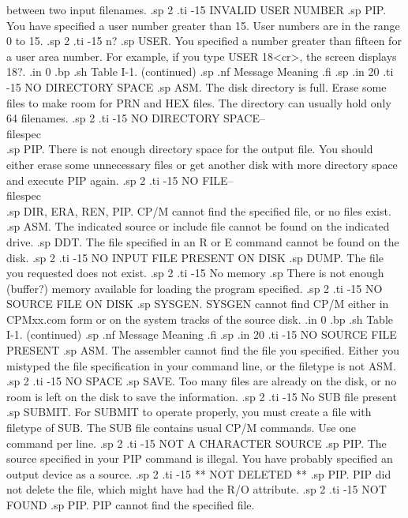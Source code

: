 between two input filenames.
.sp 2
.ti -15
INVALID USER NUMBER
.sp
PIP.  You have specified a user number greater than 15.  User 
numbers are in the range 0 to 15.
.sp 2
.ti -15
n?
.sp
USER.  You specified a number greater than fifteen for a user 
area number.  For example, if you type USER 18<cr>, the screen 
displays 18?.
.in 0
.bp
.sh
                     Table I-1.  (continued)
.sp
.nf
     Message        Meaning
.fi
.sp
.in 20
.ti -15
NO DIRECTORY SPACE
.sp
ASM.  The disk directory is full.  Erase some files to make room 
for PRN and HEX files.  The directory can usually hold only 64 
filenames.
.sp 2
.ti -15
NO DIRECTORY SPACE--\\{filespec\\}
.sp
PIP.  There is not enough directory space for the output file.  
You should either erase some unnecessary files or get another 
disk with more directory space and execute PIP again.
.sp 2
.ti -15
NO FILE--\\{filespec\\}
.sp
DIR, ERA, REN, PIP.  CP/M cannot find the specified file, or no 
files exist.
.sp
ASM.  The indicated source or include file cannot be found on the 
indicated drive.
.sp
DDT.  The file specified in an R or E command cannot be found on 
the disk.
.sp 2
.ti -15
NO INPUT FILE PRESENT ON DISK
.sp
DUMP.  The file you requested does not exist.
.sp 2
.ti -15
No memory
.sp
There is not enough (buffer?) memory available for loading the 
program specified.
.sp 2
.ti -15
NO SOURCE FILE ON DISK
.sp
SYSGEN.  SYSGEN cannot find CP/M either in CPMxx.com form or on 
the system tracks of the source disk.
.in 0
.bp
.sh
                     Table I-1.  (continued)
.sp
.nf
     Message        Meaning
.fi
.sp
.in 20
.ti -15
NO SOURCE FILE PRESENT
.sp
ASM.  The assembler cannot find the file you specified.  Either 
you mistyped the file specification in your command line, or the 
filetype is not ASM.
.sp 2
.ti -15
NO SPACE
.sp
SAVE.  Too many files are already on the disk, or no room is left 
on the disk to save the information.
.sp 2
.ti -15
No SUB file present
.sp
SUBMIT.  For SUBMIT to operate properly, you must create a file 
with filetype of SUB.  The SUB file contains usual CP/M commands.  
Use one command per line.
.sp 2
.ti -15
NOT A CHARACTER SOURCE
.sp
PIP.  The source specified in your PIP command is illegal.  You 
have probably specified an output device as a source.
.sp 2
.ti -15
** NOT DELETED **
.sp
PIP.  PIP did not delete the file, which might have had the R/O 
attribute.
.sp 2
.ti -15
NOT FOUND
.sp
PIP.  PIP cannot find the specified file.
